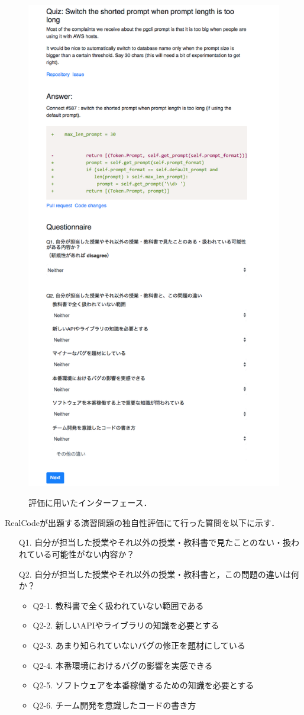 \begin{figure}[H]
　\centering
  \includegraphics[width=0.8\columnwidth]{20190107-interface-originality-evaluation.png}
  \caption{評価に用いたインターフェース．}
  \label{fig:originality-study-interface}
\end{figure}

RealCodeが出題する演習問題の独自性評価にて行った質問を以下に示す．
\begin{itemize}
  \item[Q1.] 自分が担当した授業やそれ以外の授業・教科書で見たことのない・扱われている可能性がない内容か？
  \item[Q2.] 自分が担当した授業やそれ以外の授業・教科書と，この問題の違いは何か？
  \begin{itemize}
  	  \item Q2-1. 教科書で全く扱われていない範囲である
   	  \item Q2-2. 新しいAPIやライブラリの知識を必要とする
      \item Q2-3. あまり知られていないバグの修正を題材にしている
      \item Q2-4. 本番環境におけるバグの影響を実感できる
      \item Q2-5. ソフトウェアを本番稼働するための知識を必要とする
      \item Q2-6. チーム開発を意識したコードの書き方
  \end{itemize}
\end{itemize}

